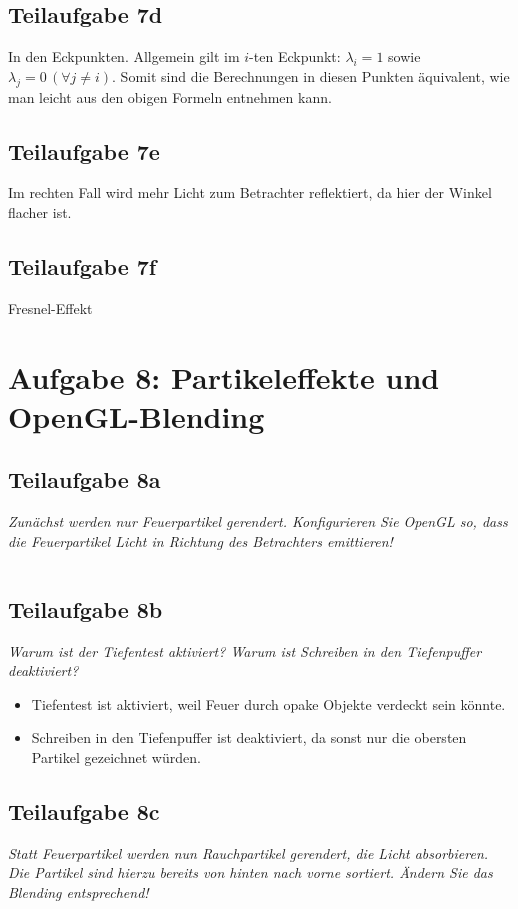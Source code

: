 \documentclass[a4paper]{scrartcl}
\begin{document}
\subsection*{Teilaufgabe 7d}
In den Eckpunkten. Allgemein gilt im $i$-ten Eckpunkt: $\lambda_i = 1$ sowie $\lambda_j = 0 \, (\forall j \neq i)$.
Somit sind die Berechnungen in diesen Punkten äquivalent, wie man leicht aus den obigen Formeln entnehmen kann.

\subsection*{Teilaufgabe 7e}
Im rechten Fall wird mehr Licht zum Betrachter reflektiert, da hier der Winkel flacher ist.

\subsection*{Teilaufgabe 7f}
Fresnel-Effekt

\clearpage
\section*{Aufgabe 8: Partikeleffekte und OpenGL-Blending}
\subsection*{Teilaufgabe 8a}
\textit{Zunächst werden nur Feuerpartikel gerendert. Konfigurieren Sie OpenGL
so, dass die Feuerpartikel Licht in Richtung des Betrachters emittieren!}

\inputminted[linenos, numbersep=5pt, tabsize=4, frame=lines, label=8a.cpp]{cpp}{8a.cpp}

\subsection*{Teilaufgabe 8b}
\textit{Warum ist der Tiefentest aktiviert? Warum ist Schreiben in den
Tiefenpuffer deaktiviert?}

\begin{itemize}
    \item Tiefentest ist aktiviert, weil Feuer durch opake Objekte verdeckt sein könnte.
    \item Schreiben in den Tiefenpuffer ist deaktiviert, da sonst nur die obersten Partikel gezeichnet würden.
\end{itemize}


\subsection*{Teilaufgabe 8c}
\textit{Statt Feuerpartikel werden nun Rauchpartikel gerendert, die Licht
absorbieren. Die Partikel sind hierzu bereits von hinten nach vorne sortiert.
Ändern Sie das Blending entsprechend!}
\end{document}
